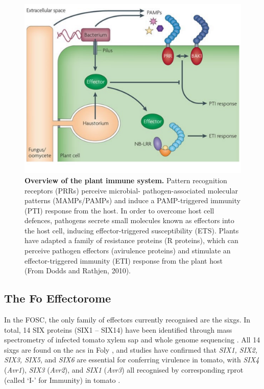 \begin{figure}[h]
    \centering
    \includegraphics[width=14cm]{Figures/DoddsArticleModel.pdf}
    \caption[Overview of the plant immune system.]{\textbf{Overview of the plant immune system.} Pattern recognition receptors (PRRs) perceive microbial- pathogen-associated molecular patterns (MAMPs/PAMPs) and induce a PAMP-triggered immunity (PTI) response from the host. In order to overcome host cell defences, pathogens secrete small molecules known as effectors into the host cell, inducing effector-triggered susceptibility (ETS). Plants have adapted a family of resistance proteins (R proteins), which can perceive pathogen effectors (avirulence proteins) and stimulate an effector-triggered immunity (ETI) response from the plant host (From Dodds and Rathjen, 2010).}
    \label{fig:PlantImmuneSystem}
\end{figure}


\subsection{The \acl{Fo} Effectorome}
\label{Chap1:fusariumEffectorome}

In the \ac{FOSC}, the only family of effectors currently recognised are the \acp{sixg}. In total, 14 SIX proteins (SIX1 – SIX14) have been identified through mass spectrometry of infected tomato xylem sap and whole genome sequencing \parencite{Houterman2007}.  All 14 \acp{sixg} are found on the \acp{ac} in \ac{Foly} \parencite{Schmidt2013}, and studies have confirmed that \textit{SIX1, SIX2, SIX3, SIX5}, and \textit{SIX6} are essential for conferring virulence in tomato, with  \textit{SIX4} (\textit{Avr1}), \textit{SIX3} (\textit{Avr2}), and \textit{SIX1} (\textit{Avr3}) all recognised by corresponding \ac{rprot} (called ‘I-’ for Immunity) in tomato \parencite{Rep2004, Lievens2009, Takken2010, Gawehns2014, Ma2015}.  

